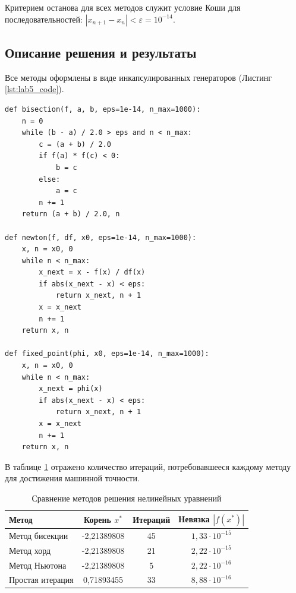 \documentclass[a4paper,14pt]{extarticle}
\begin{document}
Критерием останова для всех методов служит условие Коши для последовательностей: $|x_{n+1} - x_n| < \varepsilon = 10^{-14}$.

\subsection{Описание решения и результаты}
Все методы оформлены в виде инкапсулированных генераторов (Листинг \ref{lst:lab5_code}).

\begin{lstlisting}[caption={Численные алгоритмы решения нелинейных уравнений}, label={lst:lab5_code}]
def bisection(f, a, b, eps=1e-14, n_max=1000):
    n = 0
    while (b - a) / 2.0 > eps and n < n_max:
        c = (a + b) / 2.0
        if f(a) * f(c) < 0:
            b = c
        else:
            a = c
        n += 1
    return (a + b) / 2.0, n

def newton(f, df, x0, eps=1e-14, n_max=1000):
    x, n = x0, 0
    while n < n_max:
        x_next = x - f(x) / df(x)
        if abs(x_next - x) < eps:
            return x_next, n + 1
        x = x_next
        n += 1
    return x, n

def fixed_point(phi, x0, eps=1e-14, n_max=1000):
    x, n = x0, 0
    while n < n_max:
        x_next = phi(x)
        if abs(x_next - x) < eps:
            return x_next, n + 1
        x = x_next
        n += 1
    return x, n
\end{lstlisting}

В таблице \ref{tab:lab5_res} отражено количество итераций, потребовавшееся каждому методу для достижения машинной точности.

\begin{table}[H]
    \centering
    \caption{Сравнение методов решения нелинейных уравнений}
    \label{tab:lab5_res}
    \begin{tabular}{lccc}
        \toprule
        \textbf{Метод} & \textbf{Корень $x^*$} & \textbf{Итераций} & \textbf{Невязка $|f(x^*)|$} \\
        \midrule
        Метод бисекции & -2,21389808 & 45 & $1,33 \cdot 10^{-15}$ \\
        Метод хорд & -2,21389808 & 21 & $2,22 \cdot 10^{-15}$ \\
        Метод Ньютона & -2,21389808 & 5 & $2,22 \cdot 10^{-16}$ \\
        Простая итерация & 0,71893455 & 33 & $8,88 \cdot 10^{-16}$ \\
        \bottomrule
    \end{tabular}
\end{table}
\end{document}
